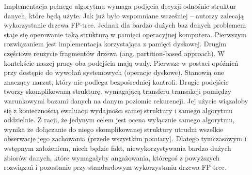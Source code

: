 Implementacja pełnego algorytmu wymaga podjęcia decyzji odnośnie struktur danych, które będą użyte. 
Jak już było wspomniane wcześniej -- autorzy zalecają wykorzystanie drzewa FP-tree. 
Jednak dla bardzo dużych baz danych problemem staje się operowanie taką strukturą w pamięci operacyjnej komputera. 
Pierwszym rozwiązaniem jest implementacja korzystająca z pamięci dyskowej.
Drugim częściowe reużycie fragmentów drzewa (ang. partition-based approach).
W kontekście naszej pracy oba podejścia mają wady. Pierwsze w postaci opóźnień przy dostępie do wywołań systemowych (operacje dyskowe). Stanowią one znaczący narzut, który nie podlega bezpośredniej kontroli.
Drugie podejście tworzy skomplikowaną strukturę, wymagającą transferu transakcji pomiędzy warunkowymi bazami danych na danym poziomie rekurencji. 
Jej użycie wiązałoby się z koniecznością ewaluacji wydajności samej struktury i samego algorytmu oddzielnie.
Z racji, że jedynym celem jest ocena wyłącznie samego algorytmu, wynika że dołączanie do niego skomplikowanej struktury utrudni wszelkie obserwacje jego zachowania (przede wszystkim pomiary).
Dlatego tymczasowym i wstępnym założeniem, niech będzie fakt, niewykorzystywania bardzo dużych zbiorów danych, które wymagałyby angażowania, któregoś z powyższych rozwiązań i pozostanie przy standardowym wykorzystaniu drzewa FP-tree.

